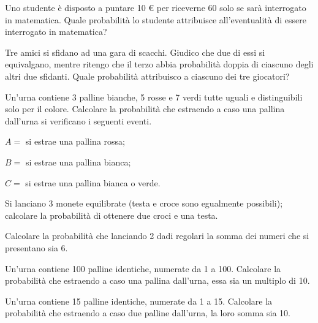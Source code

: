 \begin{esercizio}[\Ast]
 \label{ese:9.9}
Uno studente è disposto a puntare 10 € per riceverne 60 solo se sarà interrogato in matematica. Quale probabilità lo studente attribuisce all'eventualità di essere interrogato in matematica?
\end{esercizio}

\begin{esercizio}[\Ast]
 \label{ese:9.10}
Tre amici si sfidano ad una gara di scacchi. Giudico che due di essi si equivalgano, mentre ritengo che il terzo abbia probabilità doppia di ciascuno degli altri due sfidanti. Quale probabilità attribuisco a ciascuno dei tre giocatori?
\end{esercizio}

\begin{esercizio}[\Ast]
 \label{ese:9.11}
Un'urna contiene 3 palline bianche, 5 rosse e 7 verdi tutte uguali e distinguibili solo per il colore. Calcolare la probabilità che estraendo a caso una pallina dall'urna si verificano i seguenti eventi.
\begin{itemize*}
\item $ A= $ si estrae una pallina rossa;
\item $ B= $ si estrae una pallina bianca;
\item $ C= $ si estrae una pallina bianca o verde.
\end{itemize*}
\end{esercizio}

\begin{esercizio}
 \label{ese:9.12}
Si lanciano 3 monete equilibrate (testa e croce sono egualmente possibili); calcolare la probabilità di ottenere due croci e una testa.
\end{esercizio}

\begin{esercizio}[\Ast]
 \label{ese:9.13}
Calcolare la probabilità che lanciando 2 dadi regolari la somma dei numeri che si presentano sia 6.
\end{esercizio}

\begin{esercizio}[\Ast]
 \label{ese:9.14}
Un'urna contiene 100 palline identiche, numerate da 1 a 100. Calcolare la probabilità che estraendo a caso una pallina dall'urna, essa sia un multiplo di 10.
\end{esercizio}

\begin{esercizio}[\Ast]
 \label{ese:9.15}
Un'urna contiene 15 palline identiche, numerate da 1 a 15. Calcolare la probabilità che estraendo a caso due palline dall'urna, la loro somma sia 10.
\end{esercizio}

